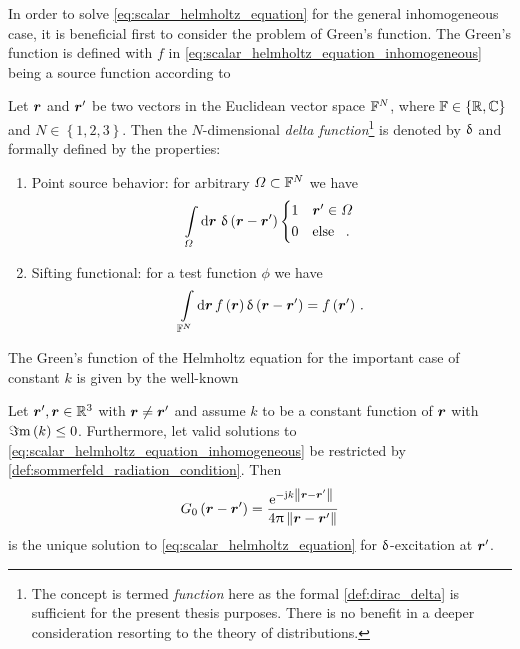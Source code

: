 In order to solve \eqref{eq:scalar_helmholtz_equation} for the general
inhomogeneous case, it is beneficial first to consider the problem of Green's
function.
The Green's function is defined with $f$ in
\eqref{eq:scalar_helmholtz_equation_inhomogeneous} being a source function
according to
\begin{definition}\label{def:dirac_delta}
	Let $\robs$ and $\rsrc$ be two vectors in the Euclidean vector space
	$\mathbb{F}^N$, where $\mathbb{F} \in \left\{\mathbb{R}, \mathbb{C}\right\}$ and
	$N \in \left\{1, 2, 3\right\}$.
	Then the $N$-dimensional \emph{delta function}\footnote{The concept is
	termed \emph{function} here as the formal \cref{def:dirac_delta} is
	sufficient for the present thesis purposes.
	There is no benefit in a deeper consideration resorting to the theory of
	distributions\cite{Strichartz2003}.} is denoted by
	$\operatorname{\updelta}$ and formally defined by the properties:
	\begin{enumerate}[label=(\alph*)]
		\item Point source behavior: for arbitrary $\Omega \subset \mathbb{F}^N$ we
		have
		\begin{equation}
			\int\limits_{\Omega} \dd \pvec{r} \,
			\diracDelta \left( \robs - \rsrc \right)
			\begin{cases*}
				1 & $\rsrc \in \Omega$ \\
				0 & \text{else} \, .
			\end{cases*} 
		\end{equation}
		\item Sifting functional: for a test function $\phi$ 
		\cite{Strichartz2003}\cite[p.~35]{Olver2010} we have
		\begin{equation}\label{eq:delta_filter_property}
			\int\limits_{\F^N} \dd \pvec{r} \,
			f \left( \robs \right)
			\diracDelta \left(\robs-\rsrc\right) =
			f \left( \rsrc \right)
			\, .
		\end{equation}
	\end{enumerate}
\end{definition}

The Green's function of the Helmholtz equation for the important case of
constant $k$ is given by the well-known \cite{Jackson2013}
\begin{corollary}\label{coll:free_space_gf}
	Let $\rsrc, \robs \in \R^3$ with $\robs \neq \rsrc$ and assume
	$k$ to be a constant function of $\robs$ with $\Im\mathrm{m}\left(k\right) \leq 0$.
	Furthermore, let valid solutions to
	\eqref{eq:scalar_helmholtz_equation_inhomogeneous} be restricted by
	\cref{def:sommerfeld_radiation_condition}.
	Then
	\begin{equation}\label{eq:scalar_free_space_gf}
		G_0 \left( \rdiff \right) =
		\frac{\exp{-\im k \rdiffNorm}}{4\pi \rdiffNorm}
	\end{equation}
	is the unique solution to \eqref{eq:scalar_helmholtz_equation} for
	$\operatorname{\updelta}$-excitation at $\rsrc$.
\end{corollary}


